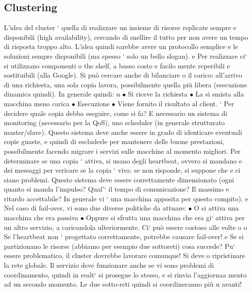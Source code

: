 \documentclass[a4paper,12pt]{article}
\begin{document}
\subsection{Clustering}
L'idea del cluster ` quella di realizzare un insieme di risorse replicate sempre
e
disponibili (high availability), cercando di snellire il tutto per non avere un tempo di risposta troppo alto. L'idea
quindi sarebbe avere un protocollo semplice
e le soluzioni sempre disponibili (ma spesso ` solo un bello slogan).
e
Per realizzare ci` si utilizzano componenti o the shelf, a basso costo e facilo
mente reperibili e sostituibili (alla Google). Si può cercare anche di bilanciare
o
il carico: all'arrivo di una richiesta, una sola copia lavora, possibilmente quella
più libera (esecuzione dinamica quindi). In generale quindi:
u
$\bullet$ Si riceve la richiesta
$\bullet$ La si smista alla macchina meno carica
$\bullet$ Esecuzione
$\bullet$ Viene fornito il risultato al client.
`
Per decidere quale copia debba eseguire, come si fa? E necessario un sistema
di monitoring (necessario per la QoS), uno scheduler (in generale strutturato
master/slave). Questo sistema deve anche essere in grado di identicare eventuali copie guaste, e quindi di escluderle
per mantenere delle buone prestazioni,
possibilmente facendo migrare i servizi sulle macchine al momento migliori. Per
determinare se una copia ` attiva, si usano degli heartbeat, ovvero si mandano
e
dei messaggi per vericare se la copia ` viva: se non risponde, si suppone che
e
ci siano problemi. Questo sistema deve essere correttamente dimensionato (ogni quanto si manda l'impulso? Qual'` il
tempo di comunicazione? Il massimo
e
ritardo accettabile? In generale vi ` una macchina apposita per questo compito).
e
Nel caso di fail-over, vi sono due diverse politiche da attuare:
$\bullet$ O si attiva una macchina che era passiva
$\bullet$ Oppure si sfrutta una macchina che era gi` attiva per un altro servizio,
a
caricandola ulteriormente. Ci` può essere costoso alle volte
o o
Se l'heartbeat non ` progettato correttamente, potrebbe causare fail-over!
e
Se si partizionano le risorse (abbiamo per esempio due sottoreti) cosa succede? Pu` essere problematico, il cluster
dovrebbe lavorare comunque! Si deve
o
ripristinare la rete globale. Il servizio deve funzionare anche se vi sono problemi
di coordinamento, quindi in realt` si prosegue lo stesso, e si rinvia l'aggiornaa
mento ad un secondo momento. Le due sotto-reti quindi si coordineranno più
u
avanti!
\end{document}
